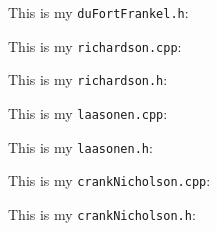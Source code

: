 \documentclass [10 pt, a4 paper]{article}
\begin{document}
This is my \texttt{duFortFrankel.h}:


This is my \texttt{richardson.cpp}:


This is my \texttt{richardson.h}:


This is my \texttt{laasonen.cpp}:


This is my \texttt{laasonen.h}:


This is my \texttt{crankNicholson.cpp}:


This is my \texttt{crankNicholson.h}:

\end{document}
